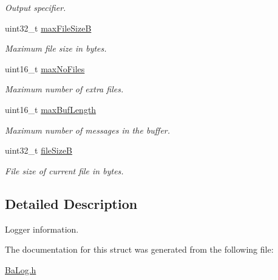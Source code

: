 \begin{DoxyCompactItemize}
\begin{DoxyCompactList}\small\item\em Output specifier. \end{DoxyCompactList}\item 
uint32\+\_\+t \hyperlink{structTBaLogInfo_aa3bf9b90409a8e9e83696ab940efd522}{max\+File\+SizeB}\hypertarget{structTBaLogInfo_aa3bf9b90409a8e9e83696ab940efd522}{}\label{structTBaLogInfo_aa3bf9b90409a8e9e83696ab940efd522}

\begin{DoxyCompactList}\small\item\em Maximum file size in bytes. \end{DoxyCompactList}\item 
uint16\+\_\+t \hyperlink{structTBaLogInfo_adbd1ecdf038ce3e82990c26e3f9810e2}{max\+No\+Files}\hypertarget{structTBaLogInfo_adbd1ecdf038ce3e82990c26e3f9810e2}{}\label{structTBaLogInfo_adbd1ecdf038ce3e82990c26e3f9810e2}

\begin{DoxyCompactList}\small\item\em Maximum number of extra files. \end{DoxyCompactList}\item 
uint16\+\_\+t \hyperlink{structTBaLogInfo_adc7f0a818941399d8b8e69aa005863ae}{max\+Buf\+Length}\hypertarget{structTBaLogInfo_adc7f0a818941399d8b8e69aa005863ae}{}\label{structTBaLogInfo_adc7f0a818941399d8b8e69aa005863ae}

\begin{DoxyCompactList}\small\item\em Maximum number of messages in the buffer. \end{DoxyCompactList}\item 
uint32\+\_\+t \hyperlink{structTBaLogInfo_a16fdaba7033102060e6ceb3c4d8d70b6}{file\+SizeB}\hypertarget{structTBaLogInfo_a16fdaba7033102060e6ceb3c4d8d70b6}{}\label{structTBaLogInfo_a16fdaba7033102060e6ceb3c4d8d70b6}

\begin{DoxyCompactList}\small\item\em File size of current file in bytes. \end{DoxyCompactList}\end{DoxyCompactItemize}


\subsection{Detailed Description}
Logger information. 

The documentation for this struct was generated from the following file\+:\begin{DoxyCompactItemize}
\item 
\hyperlink{BaLog_8h}{Ba\+Log.\+h}\end{DoxyCompactItemize}

